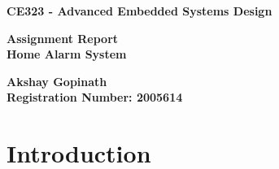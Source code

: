 \documentclass[aps, secnumarabic, balancelastpage, asmath, amssymb, nofootinbib, floatfix,]{revtex4-2}
\begin{document}
    \begin{titlepage}
   \begin{center}
       \vspace*{1cm}

	\Huge
       \textbf{CE323 - Advanced Embedded Systems Design}

       \vspace{0.5cm}

       \LARGE
        \textbf{Assignment Report\\Home Alarm System}

       \vspace{1.5cm}

       \textbf{Akshay Gopinath}\\
       \textbf{Registration Number: 2005614}

   \end{center}
   \tableofcontents
   \listoffigures
\end{titlepage}














\clearpage


\section{\fontsize{11.3pt}{12pt}\selectfont \bf Introduction}
\fontsize{11pt}{12pt}\selectfont
\label{sec:1}
\end{document}
